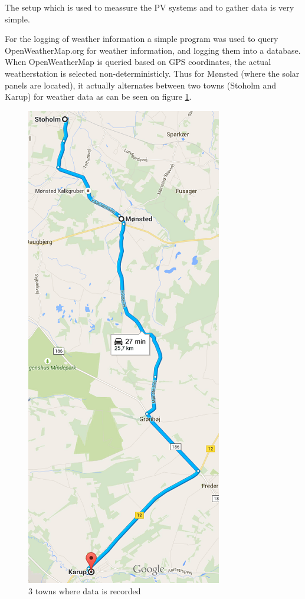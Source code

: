 The setup which is used to meassure the PV systems and to gather data
is very simple.

For the logging of weather information a simple program was used to
query OpenWeatherMap.org for weather information, and logging them
into a database.  When OpenWeatherMap is queried based on GPS
coordinates, the actual weatherstation is selected
non-deterministicly.  Thus for Mønsted (where the solar panels are
located), it actually alternates between two towns (Stoholm and Karup)
for weather data as can be seen on figure \ref{fig:mapsPicture}.

\begin{figure}[h]
  \centering
  \includegraphics{MapsPicture.png}
  \caption{3 towns where data is recorded}
  \label{fig:mapsPicture}
\end{figure}

